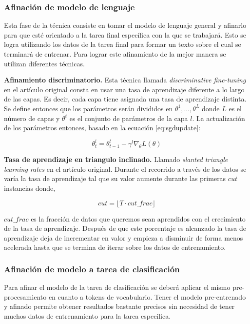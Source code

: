 \subsubsection{Afinación de modelo de lenguaje}
\label{lmftune}

Esta fase de la técnica consiste en tomar el modelo de lenguaje general y afinarlo para que esté orientado a la tarea final específica con la que se trabajará. Esto se logra utilizando los datos de la tarea final para formar un texto sobre el cual se terminará de entrenar. Para lograr este afinamiento de la mejor manera se utilizan diferentes técnicas.

\textbf{Afinamiento discriminatorio.} Esta técnica llamada \emph{discriminative fine-tuning} en el artículo original consta en usar una tasa de aprendizaje diferente a lo largo de las capas. Es decir, cada capa tiene asignada una tasa de aprendizaje distinta. Se define entonces que los parámetros serán divididos en ${\theta^1, \ldots, \theta^L}$ donde $L$ es el número de capas y $\theta^t$ es el conjunto de parámetros de la capa $l$. La actualización de los parámetros entonces, basado en la ecuación \ref{eq:sgdupdate}:

\begin{equation}
\label{eq:discupdate}
\theta_t^l = \theta_{t-1}^l - \gamma^l \nabla_{\theta} L(\theta)
\end{equation}

\textbf{Tasa de aprendizaje en triangulo inclinado.} Llamado \emph{slanted triangle learning rates} en el artículo original. Durante el recorrido a través de los datos se varía la tasa de aprendizaje tal que su valor aumente durante las primeras $cut$ instancias donde,

$$ cut = \lfloor T \cdot cut\_frac \rfloor$$

$cut\_frac$ es la fracción de datos que queremos sean aprendidos con el crecimiento de la tasa de aprendizaje. Después de que este porcentaje es alcanzado la tasa de aprendizaje deja de incrementar en valor y empieza a disminuir de forma menos acelerada hasta que se termina de iterar sobre los datos de entrenamiento.

\subsubsection{Afinación de modelo a tarea de clasificación}

Para afinar el modelo de la tarea de clasificación se deberá aplicar el mismo pre-procesamiento en cuanto a tokens de vocabulario. Tener el modelo pre-entrenado y afinado permite obtener resultados bastante precisos sin necesidad de tener muchos datos de entrenamiento para la tarea específica.

